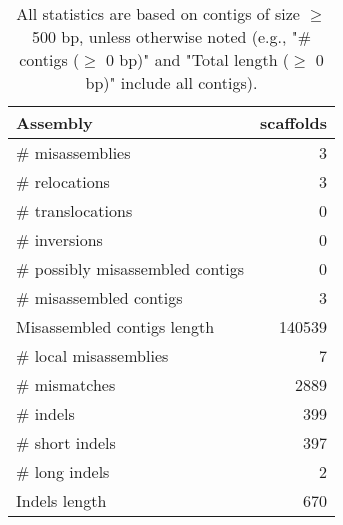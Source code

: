 \documentclass[12pt,a4paper]{article}
\begin{document}
\begin{table}[ht]
\begin{center}
\caption{All statistics are based on contigs of size $\geq$ 500 bp, unless otherwise noted (e.g., "\# contigs ($\geq$ 0 bp)" and "Total length ($\geq$ 0 bp)" include all contigs).}
\begin{tabular}{|l*{1}{|r}|}
\hline
Assembly & scaffolds \\ \hline
\# misassemblies & 3 \\ \hline
\hspace{5mm}\# relocations & 3 \\ \hline
\hspace{5mm}\# translocations & 0 \\ \hline
\hspace{5mm}\# inversions & 0 \\ \hline
\# possibly misassembled contigs & 0 \\ \hline
\# misassembled contigs & 3 \\ \hline
Misassembled contigs length & 140539 \\ \hline
\# local misassemblies & 7 \\ \hline
\# mismatches & 2889 \\ \hline
\# indels & 399 \\ \hline
\hspace{5mm}\# short indels & 397 \\ \hline
\hspace{5mm}\# long indels & 2 \\ \hline
Indels length & 670 \\ \hline
\end{tabular}
\end{center}
\end{table}
\end{document}
